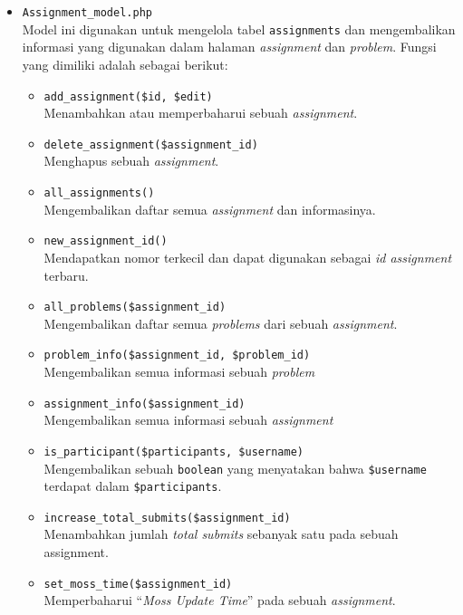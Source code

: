\begin{itemize}
	\item \verb|Assignment_model.php| \\
	      Model ini digunakan untuk mengelola tabel \verb|assignments| dan mengembalikan informasi yang digunakan dalam halaman \textit{assignment} dan \textit{problem}. Fungsi yang dimiliki adalah sebagai berikut:

	      \begin{itemize}
		      \item \verb|add_assignment($id, $edit)| \\
		            Menambahkan atau memperbaharui sebuah \textit{assignment}.
		      \item \verb|delete_assignment($assignment_id)| \\
		            Menghapus sebuah \textit{assignment}.
		      \item \verb|all_assignments()| \\
		            Mengembalikan daftar semua \textit{assignment} dan informasinya.
		      \item \verb|new_assignment_id()| \\
		            Mendapatkan nomor terkecil dan dapat digunakan sebagai \textit{id assignment} terbaru.
		      \item \verb|all_problems($assignment_id)| \\
		            Mengembalikan daftar semua \textit{problems} dari sebuah \textit{assignment}.
		      \item \verb|problem_info($assignment_id, $problem_id)| \\
		            Mengembalikan semua informasi sebuah \textit{problem}
		      \item \verb|assignment_info($assignment_id)| \\
		            Mengembalikan semua informasi sebuah \textit{assignment}
		      \item \verb|is_participant($participants, $username)| \\
		            Mengembalikan sebuah \verb|boolean| yang menyatakan bahwa \verb|$username| terdapat dalam \verb|$participants|.
		      \item \verb|increase_total_submits($assignment_id)| \\
		            Menambahkan jumlah \textit{total submits} sebanyak satu pada sebuah assignment.
		      \item \verb|set_moss_time($assignment_id)| \\
		            Memperbaharui ``\textit{Moss Update Time}'' pada sebuah \textit{assignment}.

\end{itemize}
\end{itemize}
